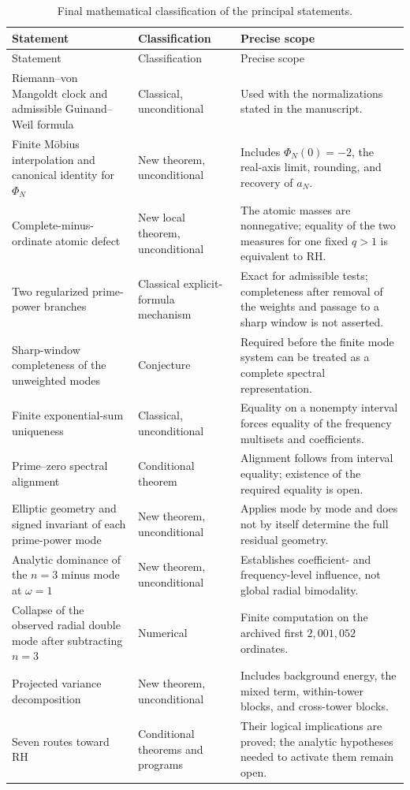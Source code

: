 \documentclass[11pt]{amsart}
\numberwithin{equation}{section}
\theoremstyle{plain}
\theoremstyle{definition}
\theoremstyle{remark}
\newcommand{\1}{\mathbf{1}}
\begin{document}
\begin{center}
\begin{longtable}{>{\raggedright\arraybackslash}p{}
                  >{\raggedright\arraybackslash}p{}
                  >{\raggedright\arraybackslash}p{}}
\caption{Final mathematical classification of the principal statements.}
\label{tab:final_status}\\
\toprule
Statement & Classification & Precise scope \\
\midrule
\endfirsthead
\toprule
Statement & Classification & Precise scope \\
\midrule
\endhead
Riemann--von Mangoldt clock and admissible Guinand--Weil formula
& Classical, unconditional
& Used with the normalizations stated in the manuscript. \\
Finite Möbius interpolation and canonical identity for $\Phi_N$
& New theorem, unconditional
& Includes $\Phi_N(0)=-2$, the real-axis limit, rounding, and recovery of $a_N$. \\
Complete-minus-ordinate atomic defect
& New local theorem, unconditional
& The atomic masses are nonnegative; equality of the two measures for one fixed $q>1$ is equivalent to RH. \\
Two regularized prime-power branches
& Classical explicit-formula mechanism
& Exact for admissible tests; completeness after removal of the weights and passage to a sharp window is not asserted. \\
Sharp-window completeness of the unweighted modes
& Conjecture
& Required before the finite mode system can be treated as a complete spectral representation. \\
Finite exponential-sum uniqueness
& Classical, unconditional
& Equality on a nonempty interval forces equality of the frequency multisets and coefficients. \\
Prime--zero spectral alignment
& Conditional theorem
& Alignment follows from interval equality; existence of the required equality is open. \\
Elliptic geometry and signed invariant of each prime-power mode
& New theorem, unconditional
& Applies mode by mode and does not by itself determine the full residual geometry. \\
Analytic dominance of the $n=3$ minus mode at $\omega=1$
& New theorem, unconditional
& Establishes coefficient- and frequency-level influence, not global radial bimodality. \\
Collapse of the observed radial double mode after subtracting $n=3$
& Numerical
& Finite computation on the archived first $2{,}001{,}052$ ordinates. \\
Projected variance decomposition
& New theorem, unconditional
& Includes background energy, the mixed term, within-tower blocks, and cross-tower blocks. \\
Seven routes toward RH
& Conditional theorems and programs
& Their logical implications are proved; the analytic hypotheses needed to activate them remain open. \\
\bottomrule
\end{longtable}
\end{center}
\end{document}
